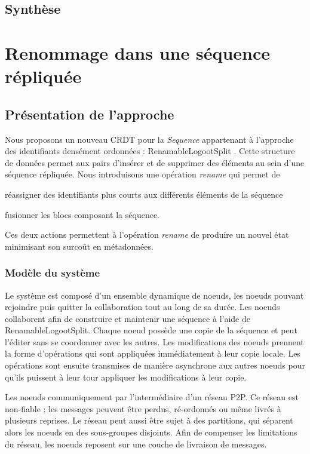 \documentclass[12pt]{thesul}
\begin{document}
\section{Synthèse}

% 

\NumberThisInToc
\chapter{Renommage dans une séquence répliquée}
\minitoc

\section{Présentation de l'approche}

Nous proposons un nouveau \ac{CRDT} pour la \emph{Sequence} appartenant à l'approche des identifiants densément ordonnées : RenamableLogootSplit \cite{nicolas:hal-01932552,nicolas:hal-02526724}.
Cette structure de données permet aux pairs d'insérer et de supprimer des éléments au sein d'une séquence répliquée.
Nous introduisons une opération \emph{rename} qui permet de
\begin{enumerate*}[label=(\roman*)]
  \item réassigner des identifiants plus courts aux différents éléments de la séquence
  \item fusionner les blocs composant la séquence.
\end{enumerate*}
Ces deux actions permettent à l'opération \emph{rename} de produire un nouvel état minimisant son surcoût en métadonnées.

\subsection{Modèle du système}

Le système est composé d'un ensemble dynamique de noeuds, les noeuds pouvant rejoindre puis quitter la collaboration tout au long de sa durée.
Les noeuds collaborent afin de construire et maintenir une séquence à l'aide de RenamableLogootSplit.
Chaque noeud possède une copie de la séquence et peut l'éditer sans se coordonner avec les autres.
Les modifications des noeuds prennent la forme d'opérations qui sont appliquées immédiatement à leur copie locale.
Les opérations sont ensuite transmises de manière asynchrone aux autres noeuds pour qu'ils puissent à leur tour appliquer les modifications à leur copie.

Les noeuds communiquement par l'intermédiaire d'un réseau \ac{P2P}.
Ce réseau est non-fiable : les messages peuvent être perdus, ré-ordonnés ou même livrés à plusieurs reprises.
Le réseau peut aussi être sujet à des partitions, qui séparent alors les noeuds en des sous-groupes disjoints.
Afin de compenser les limitations du réseau, les noeuds reposent sur une couche de livraison de messages.
\end{document}
